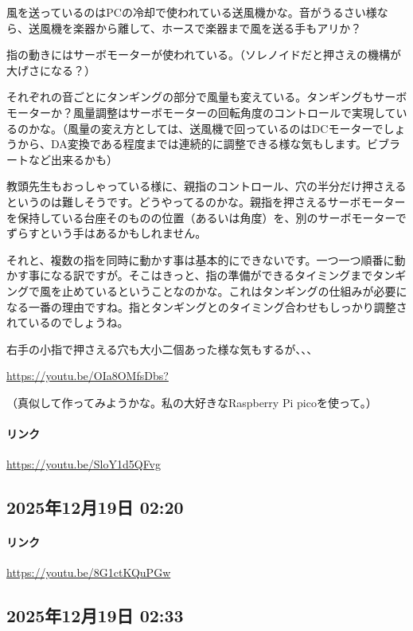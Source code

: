 風を送っているのはPCの冷却で使われている送風機かな。音がうるさい様なら、送風機を楽器から離して、ホースで楽器まで風を送る手もアリか？

指の動きにはサーボモーターが使われている。（ソレノイドだと押さえの機構が大げさになる？）

それぞれの音ごとにタンギングの部分で風量も変えている。タンギングもサーボモーターか？風量調整はサーボモーターの回転角度のコントロールで実現しているのかな。（風量の変え方としては、送風機で回っているのはDCモーターでしょうから、DA変換である程度までは連続的に調整できる様な気もします。ビブラートなど出来るかも）

教頭先生もおっしゃっている様に、親指のコントロール、穴の半分だけ押さえるというのは難しそうです。どうやってるのかな。親指を押さえるサーボモーターを保持している台座そのものの位置（あるいは角度）を、別のサーボモーターでずらすという手はあるかもしれません。

それと、複数の指を同時に動かす事は基本的にできないです。一つ一つ順番に動かす事になる訳ですが。そこはきっと、指の準備ができるタイミングまでタンギングで風を止めているということなのかな。これはタンギングの仕組みが必要になる一番の理由ですね。指とタンギングとのタイミング合わせもしっかり調整されているのでしょうね。

右手の小指で押さえる穴も大小二個あった様な気もするが、、、

\url{https://youtu.be/OIa8OMfsDbs?}

（真似して作ってみようかな。私の大好きなRaspberry Pi picoを使って。）

\paragraph{リンク}
\url{https://youtu.be/SloY1d5QFvg}

\subsection*{2025年12月19日 02:20}

\paragraph{リンク}
\url{https://youtu.be/8G1ctKQuPGw}

\subsection*{2025年12月19日 02:33}

